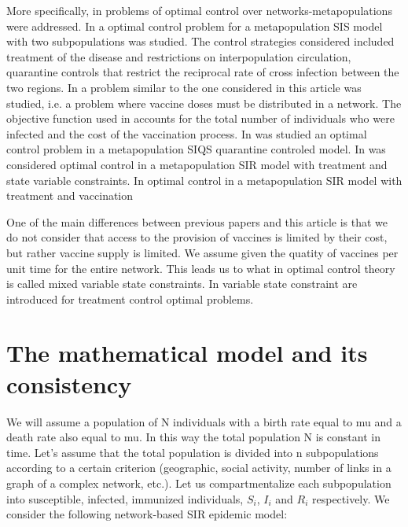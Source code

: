 \documentclass[a4paper,10pt]{article}
\theoremstyle{remark}
\begin{document}
More specifically, in \cite{rowthorn2009optimal,asano2008optimal, mbah2011resource,Chen-2014,Chen-2014b}  problems of optimal control over networks-metapopulations were addressed.
In \cite{rowthorn2009optimal} a optimal control problem for a metapopulation SIS model with two subpopulations was studied.  The control strategies considered included treatment of the disease and restrictions on interpopulation circulation, quarantine controls that
restrict the reciprocal rate of cross infection between
the two regions. In \cite{asano2008optimal} a problem similar to the one considered in this article was studied, i.e. a problem  where vaccine doses must be distributed in a network. The objective function used in \cite{asano2008optimal} accounts for the total number of individuals who were infected and the cost of the vaccination process.  In \cite{Li-2019} was studied an optimal control problem in a metapopulation  SIQS quarantine controled  model. In \cite{mbah2011resource} was considered optimal control in a metapopulation  SIR model with   treatment and state variable constraints. 
In \cite{Chen-2014,Chen-2014b} optimal control in a metapopulation  SIR model with   treatment and vaccination
 
 One of the main differences between previous papers  and this article is that we do not consider that access to the provision of vaccines is  limited by their cost, but rather vaccine supply is limited. We assume given the quatity of vaccines per unit time   for the entire network. This leads us to what in optimal control theory is called mixed variable state constraints. In \cite{mbah2011resource, rowthorn2009optimal} variable state constraint are introduced for  treatment control optimal problems.  

 

 
\section{The mathematical model and its  consistency}

We will assume a population of N individuals with a birth rate equal to mu and a death rate also equal to mu. In this way the total population N is constant in time. Let's assume that the total population is divided into n subpopulations according to a certain criterion (geographic, social activity, number of links in a graph of a complex network, etc.). Let us compartmentalize each subpopulation into susceptible, infected, immunized individuals, $S_i$, $I_i$ and $R_i$ respectively. We consider the following network-based SIR epidemic model:
\end{document}

